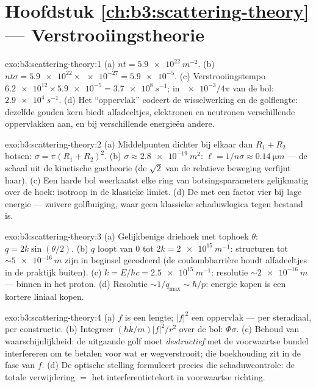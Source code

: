 \section*{Hoofdstuk \ref{ch:b3:scattering-theory} --- Verstrooiingstheorie}

\begin{solution}{exo:b3:scattering-theory:1}
(a) $nt = \qty{5.9e22}{m^{-2}}$. (b) $nt\sigma = \num{5.9e22}
\times \num{e-27} = \num{5.9e-5}$. (c) Verstrooiingstempo
$\num{6.2e12} \times \num{5.9e-5} = \qty{3.7e8}{s^{-1}}$; in
$\num{e-3}/4\pi$ van de bol: $\qty{2.9e4}{s^{-1}}$. (d) Het
``oppervlak'' codeert de wisselwerking en de golflengte: dezelfde gouden
kern biedt alfadeeltjes, elektronen en neutronen verschillende
oppervlakken aan, en bij verschillende energieën andere.
\end{solution}

\begin{solution}{exo:b3:scattering-theory:2}
(a) Middelpunten dichter bij elkaar dan $R_1 + R_2$ botsen: $\sigma = \pi(R_1 +
R_2)^2$. (b) $\sigma \approx \qty{2.8e-19}{m^2}$: $\ell = 1/n\sigma
\approx \qty{0.14}{\micro m}$ --- de schaal uit de kinetische
gastheorie (de $\sqrt2$ van de relatieve beweging verfijnt haar). (c) Een
harde bol weerkaatst elke ring van botsingsparameters gelijkmatig over de
hoek: isotroop in de klassieke limiet. (d) De  met een
factor vier bij lage energie --- zuivere golfbuiging, waar geen klassieke
schaduwlogica tegen bestand is.
\end{solution}

\begin{solution}{exo:b3:scattering-theory:3}
(a) Gelijkbenige driehoek met tophoek $\theta$: $q =
2k\sin(\theta/2)$.
(b) $q$ loopt van $0$ tot $2k = \qty{2e15}{
m^{-1}}$: structuren tot
$\sim\qty{5e-16}{m}$ zijn in beginsel gecodeerd (de coulombbarrière houdt
alfadeeltjes in de praktijk buiten). (c) $k = E/\hbar c = \qty{2.5e15}{m^{-1}}$: resolutie $\sim\qty{2e-16}{m}$ --- binnen in het
proton. (d) Resolutie $\sim 1/q_{\max} \sim \hbar/p$: energie kopen is een
kortere liniaal kopen.
\end{solution}

\begin{solution}{exo:b3:scattering-theory:4}
(a) $f$ is een lengte; $|f|^2$ een oppervlak --- per steradiaal, per
constructie. (b) Integreer $(\hbar k/m)|f|^2/r^2$ over de bol:
$\Phi\sigma$. (c) Behoud van waarschijnlijkheid: de uitgaande golf moet
\emph{destructief} met de voorwaartse bundel interfereren om te betalen
voor wat er wegverstrooit; die boekhouding zit in de fase van $f$. (d) De
optische stelling formuleert precies die schaduwcontrole: de totale
verwijdering $=$ het interferentietekort in voorwaartse richting.
\end{solution}

